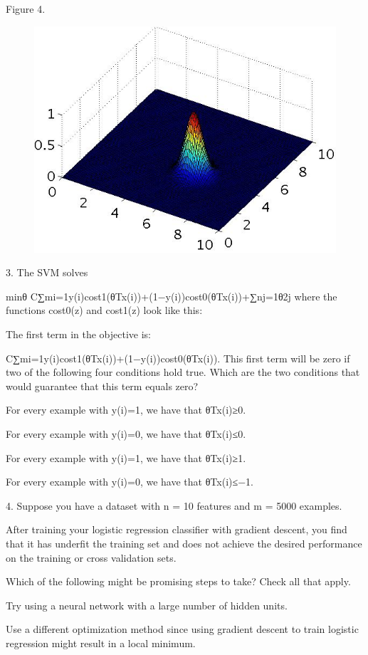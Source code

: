 \documentclass[11pt]{article} %
\begin{document}
Figure 4.

\begin{figure}
	\centering
	\includegraphics[width=0.7\linewidth]{images/SVM5}
\end{figure}

3. 
The SVM solves

minθ C∑mi=1y(i)cost1(θTx(i))+(1−y(i))cost0(θTx(i))+∑nj=1θ2j
where the functions cost0(z) and cost1(z) look like this:


The first term in the objective is:

C∑mi=1y(i)cost1(θTx(i))+(1−y(i))cost0(θTx(i)).
This first term will be zero if two of the following four conditions hold true. Which are the two conditions that would guarantee that this term equals zero?

For every example with y(i)=1, we have that θTx(i)≥0.

For every example with y(i)=0, we have that θTx(i)≤0.

For every example with y(i)=1, we have that θTx(i)≥1.

For every example with y(i)=0, we have that θTx(i)≤−1.

4. 
Suppose you have a dataset with n = 10 features and m = 5000 examples.

After training your logistic regression classifier with gradient descent, you find that it has underfit the training set and does not achieve the desired performance on the training or cross validation sets.

Which of the following might be promising steps to take? Check all that apply.

Try using a neural network with a large number of hidden units.

Use a different optimization method since using gradient descent to train logistic regression might result in a local minimum.
\end{document}
